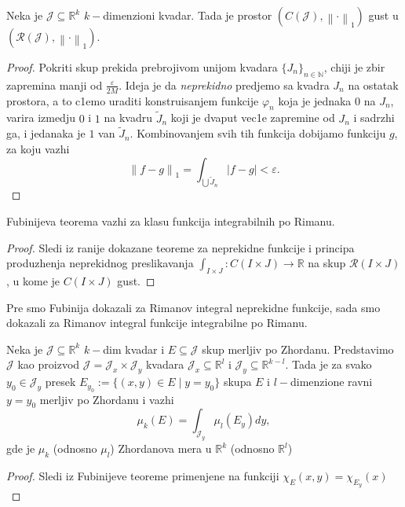 \documentclass[a4paper,12pt]{article}
\newcommand{\NN}{\mathbb{N}}
\newcommand{\RR}{\mathbb{R}}
\newcommand{\eps}{\varepsilon}
\newcommand{\psj}{\subseteq}
\newcommand{\norm}[1]{\left\lVert#1\right\rVert}
\begin{document}
\begin{tvr}
	Neka je $\mathcal J \psj \RR^k$ $k-$dimenzioni kvadar. Tada je prostor $(C(\mathcal J), \norm{\cdot}_1)$
	gust u $(\mathcal R(\mathcal J), \norm{\cdot}_1)$.
\end{tvr}
\begin{proof}
	Pokriti skup prekida prebrojivom unijom kvadara $\{J_n\}_{n \in \NN}$, chiji je zbir zapremina manji od $ \frac{\eps}{2M}$. Ideja
	je da \textit{neprekidno} predjemo sa kvadra $J_n$ na ostatak prostora, a to c1emo uraditi konstruisanjem funkcije
	$\varphi_n$ koja je jednaka $0$ na $J_n$, varira izmedju $0$ i $1$ na kvadru $\widetilde{J}_n$ koji je dvaput vec1e zapremine
	od $J_n$ i sadrzhi ga, i jedanaka je $1$ van $\widetilde{J}_n$. Kombinovanjem svih tih funkcija dobijamo funkciju $g$,
	za koju vazhi 
	\[  \norm{f - g}_1 = \int_{\bigcup \widetilde{J}_n} |f-g| < \eps.\] 
\end{proof}

\begin{tvr}
	Fubinijeva teorema vazhi za klasu funkcija integrabilnih po Rimanu.
\end{tvr}
\begin{proof}
	Sledi iz ranije dokazane teoreme za neprekidne funkcije i principa produzhenja neprekidnog preslikavanja
	$\int_{I\times J}: C(I\times J) \to \RR$ na skup $\mathcal R(I\times J)$, u kome je $C(I\times J)$ gust.
\end{proof}

\begin{nap}
	Pre smo Fubinija dokazali za Rimanov integral neprekidne funkcije, sada smo dokazali za Rimanov integral funkcije 
	integrabilne po Rimanu.
\end{nap}

\begin{tma}
	Neka je $\mathcal J \psj \RR^k$ $k-$dim kvadar i $E\psj \mathcal J$ skup merljiv po Zhordanu. Predstavimo $\mathcal J$
	kao proizvod $\mathcal J = \mathcal J_x \times \mathcal J_y$ kvadara $\mathcal J_x \psj \RR^l$ i $\mathcal J_y \psj \RR^{k-l}$.
	Tada je za svako $y_0 \in \mathcal J_y$ presek $E_{y_0} := \{(x, y) \in E \mid y = y_0\}$ skupa $E$ i $l-$dimenzione ravni $y=y_0$
	merljiv po Zhordanu i vazhi 
	\[ \mu_k(E) = \int_{\mathcal J_y} \mu_l (E_y)dy ,\] 
	gde je $\mu_k$ (odnosno $\mu_l$) Zhordanova mera u $\RR^k$ (odnosno $\RR^l$)
\end{tma}
\begin{proof}
	Sledi iz Fubinijeve teoreme primenjene na funkciji $\chi_E(x, y) = \chi_{E_y}(x)$
\end{proof}
\end{document}
